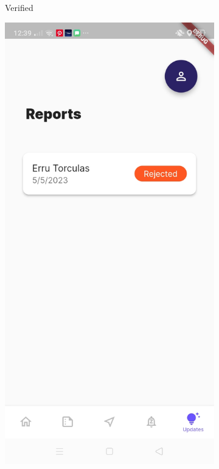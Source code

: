 \begin{figure}[!h]
\begin{subfigure}[c]{0.20\linewidth}
        \caption{Verified}
        \label{fig:StatusVerified}
    \end{subfigure}
    \centering
    \begin{subfigure}[c]{0.20\linewidth}
        \centering
        \includegraphics[scale=0.10]{figures/Chapter4/Main/Report-3.jpg}

\end{subfigure}
\end{figure}
